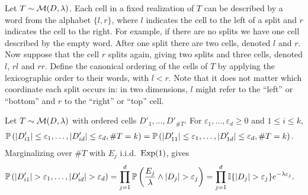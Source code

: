 \begin{definition}
  Let $T \sim \cM(D, \lambda)$.
  Each cell in a fixed realization of $T$ can be described by
  a word from the alphabet $\{l, r\}$,
  where $l$ indicates the cell to the left of a split
  and $r$ indicates the cell to the right.
  For example, if there are no splits we have one cell
  described by the empty word.
  After one split there are two cells, denoted
  $l$ and $r$.
  Now suppose that the cell $r$ splits again, giving two splits and three cells,
  denoted $l$, $r l$ and $r r$.
  Define the canonical ordering of the cells of $T$ by applying
  the lexicographic order to their words, with $l < r$.
  Note that it does not matter which coordinate each split occurs in:
  in two dimensions, $l$ might refer to the ``left'' or ``bottom''
  and $r$ to the ``right'' or ``top'' cell.
\end{definition}

\begin{lemma}
  \label{lem:cells_identically_distributed}

  Let $T \sim \cM(D, \lambda)$
  with ordered cells $D'_1, \ldots, D'_{\# T}$.
  For $\varepsilon_1, \ldots, \varepsilon_d \geq 0$
  and $1 \leq i \leq k$,
  \begin{align*}
    \P\left(
      |D'_{i1}| \leq \varepsilon_1,
      \ldots, |D'_{id}| \leq \varepsilon_d,
      \# T = k
    \right)
    &=
    \P\left(
      |D'_{11}| \leq \varepsilon_1,
      \ldots, |D'_{1d}| \leq \varepsilon_d,
      \# T = k
    \right).
  \end{align*}
  Marginalizing over $\# T$
  with $E_j$ i.i.d.\ $\Exp(1)$,
  \citet[Proposition~1]{mourtada2020minimax} gives
  \begin{align*}
    \P\left(
      |D'_{i1}| > \varepsilon_1,
      \ldots, |D'_{id}| > \varepsilon_d
    \right)
    &=
    \prod_{j=1}^d
    \P\left(
      \frac{E_j}{\lambda} \wedge |D_j|
      > \varepsilon_j
    \right)
    = \prod_{j=1}^d
    \I\{|D_j| > \varepsilon_j\}
    e^{-\lambda \varepsilon_j}.
  \end{align*}

\end{lemma}

